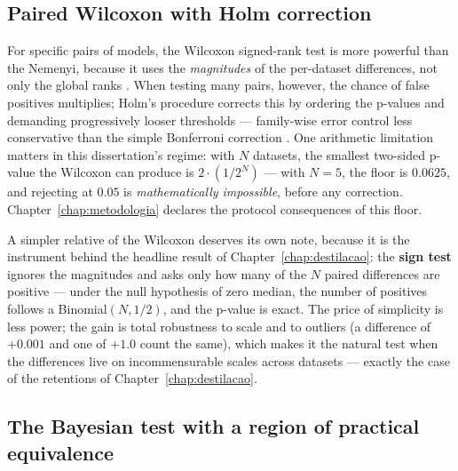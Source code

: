 \subsection{Paired Wilcoxon with Holm correction}

For specific pairs of models, the Wilcoxon signed-rank test is more
powerful than the Nemenyi, because it uses the \emph{magnitudes} of
the per-dataset differences, not only the global ranks
\citep{wilcoxon1945}. When testing many pairs, however, the chance
of false positives multiplies; Holm's procedure corrects this by
ordering the p-values and demanding progressively looser thresholds
--- family-wise error control less conservative than the simple
Bonferroni correction \citep{holm1979}. One arithmetic limitation
matters in this dissertation's regime: with $N$ datasets, the
smallest two-sided p-value the Wilcoxon can produce is
$2 \cdot (1/2^N)$ --- with $N = 5$, the floor is $0.0625$, and
rejecting at $0.05$ is \emph{mathematically impossible}, before any
correction. Chapter~\ref{chap:metodologia} declares the protocol
consequences of this floor.

A simpler relative of the Wilcoxon deserves its own note, because
it is the instrument behind the headline result of
Chapter~\ref{chap:destilacao}: the \textbf{sign test}
\citep{conover1999} ignores the magnitudes and asks only how many
of the $N$ paired differences are positive --- under the null
hypothesis of zero median, the number of positives follows a
Binomial$(N, 1/2)$, and the p-value is exact. The price of
simplicity is less power; the gain is total robustness to scale and
to outliers (a difference of $+0.001$ and one of $+1.0$ count the
same), which makes it the natural test when the differences live on
incommensurable scales across datasets --- exactly the case of the
retentions of Chapter~\ref{chap:destilacao}.

\subsection{The Bayesian test with a region of practical equivalence}

